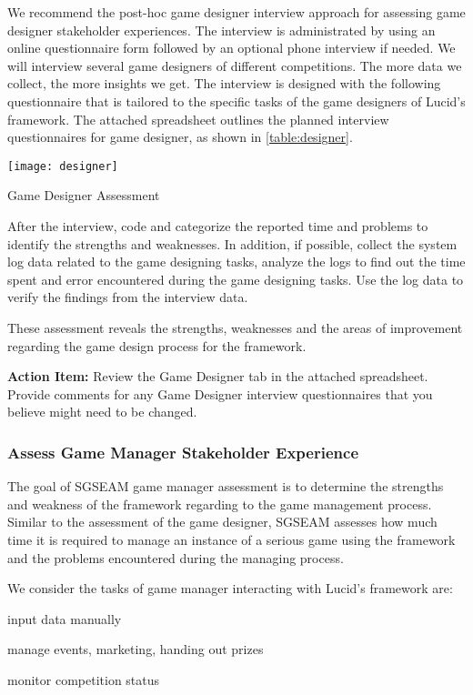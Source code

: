 We recommend the post-hoc game designer interview approach for assessing game designer stakeholder experiences.  The interview is administrated by using an online questionnaire form followed by an optional phone interview if needed. We will interview several game designers of different competitions. The more data we collect, the more insights we get. The interview is designed with the following questionnaire that is tailored to the specific tasks of the game designers of Lucid's framework. The attached spreadsheet outlines the planned interview questionnaires for game designer, as shown in \autoref{table:designer}.

\begin{table}[ht!]
  \center
  \texttt{[image: designer]}
  \caption{Game Designer Assessment}
  \label{table:designer}
\end{table}

After the interview, code and categorize the reported time and problems to identify the strengths and weaknesses. In addition, if possible, collect the system log data related to the game designing tasks, analyze the logs to find out the time spent and error encountered during the game designing tasks. Use the log data to verify the findings from the interview data.

These assessment reveals the strengths, weaknesses and the areas of improvement regarding the game design process for the framework.

\begin{shadebox}
{\bf Action Item:} Review the Game Designer tab in the attached
spreadsheet.  Provide comments for any Game Designer interview questionnaires that
you believe might need to be changed. 
\end{shadebox}

\subsubsection{Assess Game Manager Stakeholder Experience}

The goal of SGSEAM game manager assessment is to determine the strengths and weakness of the framework 
regarding to the game management process. Similar to the assessment of the game designer, SGSEAM assesses 
how much time it is required to manage an instance of a serious game using the framework
and the problems encountered during the managing process.

We consider the tasks of game manager interacting with Lucid's framework are:
\begin{compactenum}
    \item input data manually
    \item manage events, marketing, handing out prizes
    \item monitor competition status
\end{compactenum}

